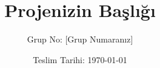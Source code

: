 \documentclass[12pt]{article}
\title{Projenizin Başlığı}
\author{Grup No: [Grup Numaranız]}
\date{Teslim Tarihi: \today}
\begin{document}
	
	
	\newpage
	
	\renewcommand{\contentsname}{İçindekiler}
	\tableofcontents
	\newpage
	
	
	
	
	
	
	
	
	
	
	
\end{document}
